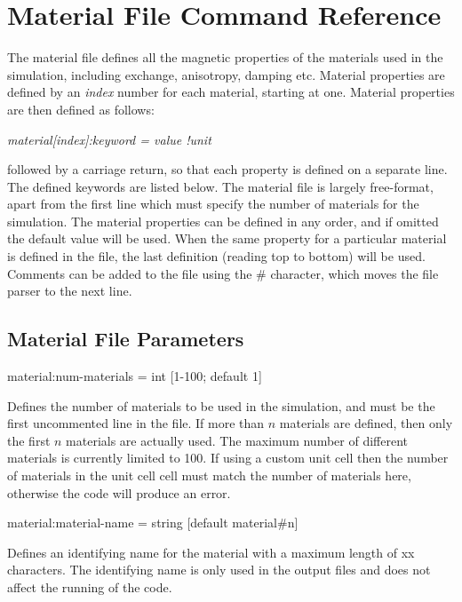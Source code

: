 
\chapter{Material File Command Reference}\label{chap:MaterialFileCommandReference}
The material file defines all the magnetic properties of the materials used in
the simulation, including exchange, anisotropy, damping etc. Material properties
are defined by an \textit{index} number for each material, starting at one.
Material properties are then defined as follows:

\textit{material[index]:keyword = value !unit}

\noindent followed by a carriage return, so that each property is defined on a
separate line. The defined keywords are listed below. The material file is
largely free-format, apart from the first line which must specify the number of
materials for the simulation. The material properties can be defined in any
order, and if omitted the default value will be used. When the same property
for a particular material is defined in the file, the last definition (reading
top to bottom) will be used. Comments can be added to the file using the \#
character, which moves the file parser to the next line.

\section*{Material File Parameters}

{\zicf material:num-materials = int [1-100; default 1]}
Defines the number of materials to be used in the simulation, and must be the
first uncommented line in the file. If more than $n$ materials are defined, then
only the first $n$ materials are actually used. The maximum number of different
materials is currently limited to 100. If using a custom unit cell then the
number of materials in the unit cell cell must match the number of materials
here, otherwise the code will produce an error.

{\zicf material:material-name = string [default material\#n]}
Defines an identifying name for the material with a maximum length of xx
characters. The identifying name is only used in the output files and does not
affect the running of the code.

